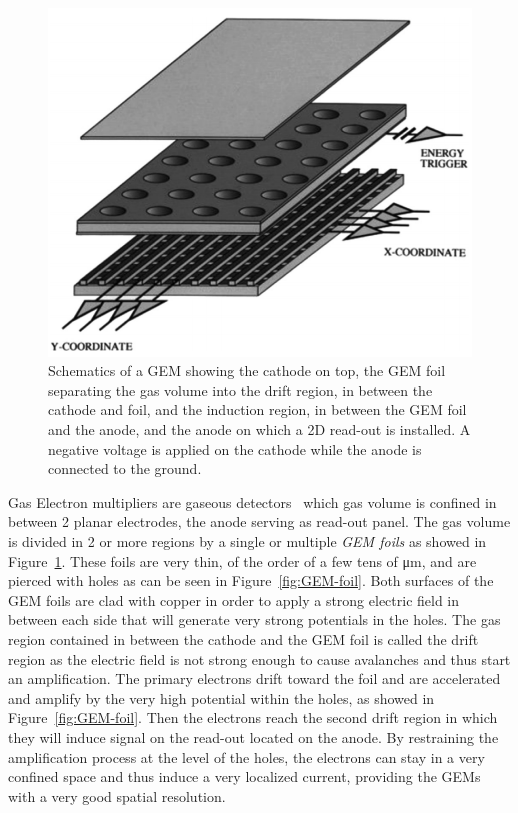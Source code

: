 	\begin{figure}[H]
		\centering
		\includegraphics[width=0.7\plotwidth]{fig/chapt3/GEM.png}
		\caption{\label{fig:GEM} Schematics of a GEM showing the cathode on top, the GEM foil separating the gas volume into the drift region, in between the cathode and foil, and the induction region, in between the GEM foil and the anode, and the anode on which a 2D read-out is installed. A negative voltage is applied on the cathode while the anode is connected to the ground.}
	\end{figure}
	
	Gas Electron multipliers are gaseous detectors~\cite{SAULI97} which gas volume is confined in between 2 planar electrodes, the anode serving as read-out panel. The gas volume is divided in 2 or more regions by a single or multiple \textit{GEM foils} as showed in Figure~\ref{fig:GEM}. These foils are very thin, of the order of a few tens of \si{\micro m}, and are pierced with holes as can be seen in Figure~\ref{fig:GEM-foil}. Both surfaces of the GEM foils are clad with copper in order to apply a strong electric field in between each side that will generate very strong potentials in the holes. The gas region contained in between the cathode and the GEM foil is called the drift region as the electric field is not strong enough to cause avalanches and thus start an amplification. The primary electrons drift toward the foil and are accelerated and amplify by the very high potential within the holes, as showed in Figure~\ref{fig:GEM-foil}. Then the electrons reach the second drift region in which they will induce signal on the read-out located on the anode. By restraining the amplification process at the level of the holes, the electrons can stay in a very confined space and thus induce a very localized current, providing the GEMs with a very good spatial resolution.
	

